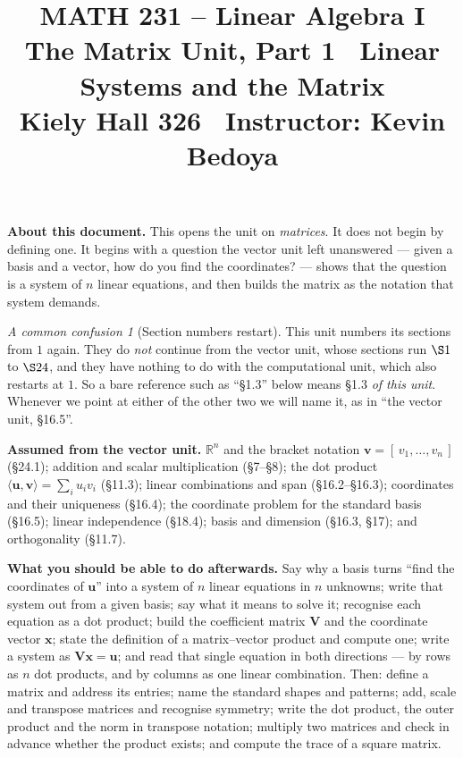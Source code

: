 \documentclass[11pt]{article}
\title{\vspace{-1.2cm}\textbf{\sffamily MATH 231 -- Linear Algebra I}\\[4pt]
       {\large\sffamily The Matrix Unit, Part 1 \textbullet\ Linear Systems
        and the Matrix}\\[2pt]
       {\normalsize\sffamily Kiely Hall 326 \textbullet\
        Instructor: Kevin Bedoya}}
\author{}
\date{}
\theoremstyle{plain}
\theoremstyle{definition}
\theoremstyle{remark}
\newtheorem*{warn}{A common confusion}
\newcommand{\R}{\mathbb{R}}
\newcommand{\vc}[1]{\mathbf{#1}}        %
\newcommand{\mt}[1]{\mathbf{#1}}        %
\begin{document}
\maketitle
\vspace{-1.6cm}

\noindent\textbf{About this document.} This opens the unit on \emph{matrices}.
It does not begin by defining one. It begins with a question the vector unit
left unanswered --- given a basis and a vector, how do you find the
coordinates? --- shows that the question is a system of $n$ linear equations,
and then builds the matrix as the notation that system demands.

\begin{warn}[Section numbers restart]
This unit numbers its sections from $1$ again. They do \emph{not} continue from
the vector unit, whose sections run $\S1$ to $\S24$, and they have nothing to do
with the computational unit, which also restarts at $1$. So a bare reference
such as ``\S1.3'' below means \S1.3 \emph{of this unit}. Whenever we point at
either of the other two we will name it, as in ``the vector unit, \S16.5''.
\end{warn}

\medskip
\noindent\textbf{Assumed from the vector unit.} $\R^{n}$ and the bracket
notation $\vc{v}=[\,v_1,\dots,v_n\,]$ (\S24.1); addition and scalar
multiplication (\S7--\S8); the dot product
$\langle\vc{u},\vc{v}\rangle=\sum_i u_iv_i$ (\S11.3); linear combinations and
span (\S16.2--\S16.3); coordinates and their uniqueness (\S16.4); the
coordinate problem for the standard basis (\S16.5); linear independence
(\S18.4); basis and dimension (\S16.3, \S17); and orthogonality (\S11.7).

\medskip
\noindent\textbf{What you should be able to do afterwards.} Say why a basis
turns ``find the coordinates of $\vc{u}$'' into a system of $n$ linear
equations in $n$ unknowns; write that system out from a given basis; say what
it means to solve it; recognise each equation as a dot product; build the
coefficient matrix $\mt{V}$ and the coordinate vector $\vc{x}$; state the
definition of a matrix--vector product and compute one; write a system as
$\mt{V}\vc{x}=\vc{u}$; and read that single equation in both directions ---
by rows as $n$ dot products, and by columns as one linear combination.
Then: define a matrix and address its entries; name the standard shapes and
patterns; add, scale and transpose matrices and recognise symmetry; write the
dot product, the outer product and the norm in transpose notation; multiply two
matrices and check in advance whether the product exists; and compute the trace
of a square matrix.
\end{document}
